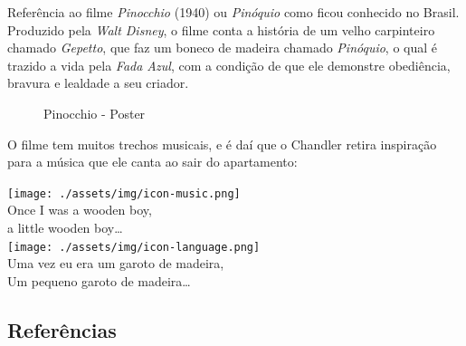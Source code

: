 \saveparinfos
\noindent
\begin{minipage}[c]{0.5\textwidth}\useparinfo

Referência ao filme \emph{Pinocchio} (1940) ou \emph{Pinóquio} como
ficou conhecido no Brasil. Produzido pela \emph{Walt Disney}, o filme
conta a história de um velho carpinteiro chamado \emph{Gepetto}, que faz
um boneco de madeira chamado \emph{Pinóquio}, o qual é trazido a vida
pela \emph{Fada Azul}, com a condição de que ele demonstre obediência,
bravura e lealdade a seu criador.

\end{minipage}\hfill
\begin{minipage}[c]{0.5\textwidth}

\begin{figure}
  \centering
    \caption{Pinocchio - Poster\label{fig:pinocchio-poster}}
\end{figure}

\end{minipage}

O filme tem muitos trechos musicais, e é daí que o Chandler retira
inspiração para a música que ele canta ao sair do apartamento:

\bigskip
\begin{tcolorbox}[enhanced,
    drop fuzzy shadow southeast, boxrule=0.3pt,
    lower separated=false, sidebyside, sidebyside align=top,
    halign=flush right, halign lower=left,
    colframe=black!30!dialogoBorder,colback=musicaBg]
\texttt{[image: ./assets/img/icon-music.png]}\\
Once I was a wooden boy,\\a little wooden boy…\\
\tcblower
\texttt{[image: ./assets/img/icon-language.png]}\\
Uma vez eu era um garoto de madeira,\\Um pequeno garoto de madeira…\\
\end{tcolorbox}

\hypertarget{referuxeancias-7}{%
\subsection{Referências}\label{referuxeancias-7}}

